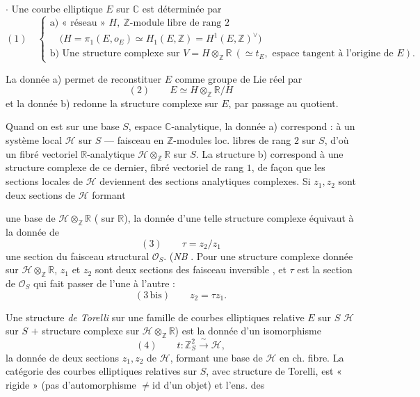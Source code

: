 \documentclass[11pt,a4paper]{article}
\begin{document}
$\cdot$ Une courbe elliptique $E$ sur $\mathbb{C}$ est déterminée par
\[
(1)\quad
\begin{cases}
\text{a) « réseau » } H,\ \mathbb{Z}\text{-module libre de rang } 2 \\
\quad \bigl(H = \pi_1(E, o_E) \simeq H_1(E,\mathbb{Z}) = H^1(E,\mathbb{Z})^{\vee}\bigr) \\
\text{b) Une structure complexe sur } V = H \otimes_{\mathbb{Z}} \mathbb{R}
\ (\simeq t_E, \text{ espace tangent à l'origine de } E).
\end{cases}
\]

La donnée a) permet de reconstituer $E$ comme groupe de Lie réel par
\[
(2)\qquad E \simeq H \otimes_{\mathbb{Z}} \mathbb{R} / H
\]
et la donnée b) redonne la structure complexe sur $E$, par passage au quotient.

Quand on est sur une base $S$, espace $\mathbb{C}$-analytique, la donnée a)
correspond : à un système local $\mathcal{H}$ sur $S$ --- faisceau en
$\mathbb{Z}$-modules loc. libres de rang $2$ sur $S$, d'où un fibré vectoriel
$\mathbb{R}$-analytique $\mathcal{H} \otimes_{\mathbb{Z}} \mathbb{R}$ sur $S$. La
structure b) correspond à une structure complexe  de ce dernier,
 fibré vectoriel  de rang $1$, de façon
que les sections locales de $\mathcal{H}$ deviennent des sections analytiques
complexes. Si \struck{\ill{}} $z_1, z_2$ sont deux sections de $\mathcal{H}$ formant

une base de $\mathcal{H} \otimes_{\mathbb{Z}} \mathbb{R}$ (
sur $\mathbb{R}$), la donnée d'une telle structure complexe équivaut à la donnée de
\[
(3)\qquad \tau = z_2 / z_1
\]
une section du faisceau structural $\mathcal{O}_S$. (\emph{NB}
\struck{\ill{}}. Pour une structure complexe donnée sur
$\mathcal{H} \otimes_{\mathbb{Z}} \mathbb{R}$, $z_1$ et $z_2$ sont deux
sections des faisceau inversible \ill{}, et
$\tau$ est la section de $\mathcal{O}_S$ qui fait passer de l'une à l'autre :
\[
(3\,\mathrm{bis})\qquad z_2 = \tau z_1 .
\]

Une structure \emph{de Torelli} sur une famille de courbes elliptiques relative
$E$ sur $S$  $\mathcal{H}$ sur $S$ $+$ structure complexe
sur $\mathcal{H} \otimes_{\mathbb{Z}} \mathbb{R}$) est la donnée d'un isomorphisme
\[
(4)\qquad t : \mathbb{Z}_S^2 \xrightarrow{\;\sim\;} \mathcal{H},
\]
\struck{\ill{}}  la donnée de deux sections $z_1, z_2$ de
$\mathcal{H}$,  formant une base de $\mathcal{H}$
en ch. fibre. La catégorie des courbes elliptiques relatives sur $S$, avec
structure de Torelli, est « rigide » \struck{\ill{}} (pas d'automorphisme
$\neq \mathrm{id}$ d'un objet) et l'ens. des
\end{document}
